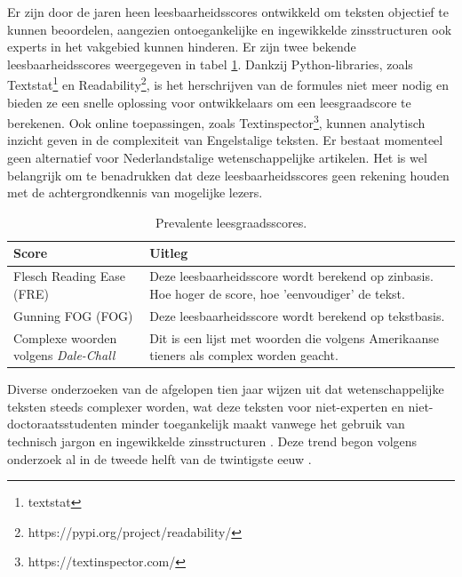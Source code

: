 \medspace


Er zijn door de jaren heen leesbaarheidsscores ontwikkeld om teksten objectief te kunnen beoordelen, aangezien ontoegankelijke en ingewikkelde zinsstructuren ook experts in het vakgebied kunnen hinderen. Er zijn twee bekende leesbaarheidsscores weergegeven in tabel \ref{table:readability-scores}. Dankzij Python-libraries, zoals Textstat\footnote{textstat} en Readability\footnote{https://pypi.org/project/readability/}, is het herschrijven van de formules niet meer nodig en bieden ze een snelle oplossing voor ontwikkelaars om een leesgraadscore te berekenen. Ook online toepassingen, zoals Textinspector\footnote{https://textinspector.com/}, kunnen analytisch inzicht geven in de complexiteit van Engelstalige teksten. Er bestaat momenteel geen alternatief voor Nederlandstalige wetenschappelijke artikelen. Het is wel belangrijk om te benadrukken dat deze leesbaarheidsscores geen rekening houden met de achtergrondkennis van mogelijke lezers.

\begin{center}
	\begin{table}[H]
	\begin{tabular}{ | m{5cm} | m{10cm} | } 
		\hline
		\textbf{Score} & \textbf{Uitleg} \\ 
		\hline
		Flesch Reading Ease (FRE) & Deze leesbaarheidsscore wordt berekend op zinbasis. Hoe hoger de score, hoe 'eenvoudiger' de tekst. \\
		\hline
		Gunning FOG (FOG) & Deze leesbaarheidsscore wordt berekend op tekstbasis. \\
		\hline
		Complexe woorden volgens \textit{Dale-Chall} & Dit is een lijst met woorden die volgens Amerikaanse tieners als complex worden geacht. \\
		\hline
	\end{tabular}
	\label{table:readability-scores}
	\caption{Prevalente leesgraadsscores.}
	\end{table}
\end{center}

Diverse onderzoeken van de afgelopen tien jaar wijzen uit dat wetenschappelijke teksten steeds complexer worden, wat deze teksten voor niet-experten en niet-doctoraatsstudenten minder toegankelijk maakt vanwege het gebruik van technisch jargon en ingewikkelde zinsstructuren \autocite{Ball2017, PlavenSigray2017, Jones2019}. Deze trend begon volgens onderzoek al in de tweede helft van de twintigste eeuw \autocite{Hayes1992}.

\medspace

